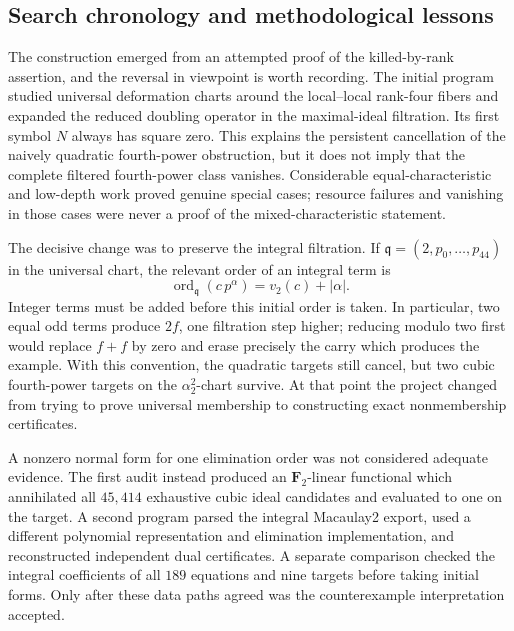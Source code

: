 \documentclass[11pt]{article}
\theoremstyle{remark}
\newcommand{\F}{\mathbf F}
\begin{document}
\subsection{Search chronology and methodological lessons}
\label{sec:search-process}

The construction emerged from an attempted proof of the killed-by-rank
assertion, and the reversal in viewpoint is worth recording.  The initial
program studied universal deformation charts around the local--local
rank-four fibers and expanded the reduced doubling operator in the
maximal-ideal filtration.  Its first symbol \(N\) always has square zero.
This explains the persistent cancellation of the naively quadratic
fourth-power obstruction, but it does not imply that the complete filtered
fourth-power class vanishes.  Considerable equal-characteristic and
low-depth work proved genuine special cases; resource failures and vanishing
in those cases were never a proof of the mixed-characteristic statement.

The decisive change was to preserve the integral filtration.  If
\(\mathfrak q=(2,p_0,\ldots,p_{44})\) in the universal chart, the relevant order of
an integral term is
\[
 \operatorname{ord}_{\mathfrak q}(c\,p^\alpha)=v_2(c)+|\alpha|.
\]
Integer terms must be added before this initial order is taken.  In
particular, two equal odd terms produce \(2f\), one filtration step higher;
reducing modulo two first would replace \(f+f\) by zero and erase precisely
the carry which produces the example.  With this convention, the quadratic
targets still cancel, but two cubic fourth-power targets on the
\(\alpha_2^2\)-chart survive.  At that point the project changed from
trying to prove universal membership to constructing exact nonmembership
certificates.

A nonzero normal form for one elimination order was not considered adequate
evidence.  The first audit instead produced an \(\F_2\)-linear functional
which annihilated all \(45{,}414\) exhaustive cubic ideal candidates and
evaluated to one on the target.  A second program parsed the integral
Macaulay2 export, used a different polynomial representation and elimination
implementation, and reconstructed independent dual certificates.  A
separate comparison checked the integral coefficients of all \(189\)
equations and nine targets before taking initial forms.  Only after these
data paths agreed was the counterexample interpretation accepted.
\end{document}
